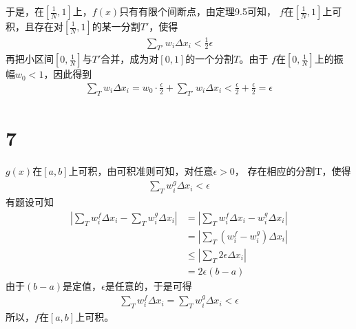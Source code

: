 \documentclass{article}
\begin{document}
于是，在$[\frac{1}{N}, 1]$上，$f(x)$只有有限个间断点，由定理9.5可知，
$f$在$[\frac{1}{N}, 1]$上可积，且存在对$[\frac{1}{N}, 1]$的某一分割$T'$，使得
\begin{align*}
  \sum\limits_{T'} w_i \Delta x_i < \frac{1}{2} \epsilon
\end{align*}
再把小区间$[0, \frac{1}{N}]$与$T'$合并，成为对$[0, 1]$的一个分割$T$。由于
$f$在$[0, \frac{1}{N}]$上的振幅$w_0 < 1$，因此得到
\begin{align*}
  \sum\limits_{T} w_i \Delta x_i 
  = w_0 \cdot \frac{\epsilon}{2} + \sum\limits_{T'} w_i \Delta x_i
  < \frac{\epsilon}{2} + \frac{\epsilon}{2} 
  = \epsilon
\end{align*}


\section*{7}

$g(x)$在$[a, b]$上可积，由可积准则可知，对任意$\epsilon > 0$，
存在相应的分割T，使得
\begin{align*}
  \sum \limits_{T} w_i^g \Delta x_i < \epsilon
\end{align*}
有题设可知
\begin{align*}
  |\sum \limits_{T} w_i^f \Delta x_i - \sum \limits_{T} w_i^g \Delta x_i|
   & = |\sum \limits_{T} w_i^f \Delta x_i - w_i^g \Delta x_i| \\
   & = |\sum \limits_{T} (w_i^f - w_i^g) \Delta x_i|          \\
   & \leq |\sum \limits_{T} 2\epsilon \Delta x_i|             \\
   & = 2\epsilon (b - a)
\end{align*}
由于$(b - a)$是定值，$\epsilon$是任意的，于是可得
\begin{align*}
  \sum \limits_{T} w_i^f \Delta x_i = \sum \limits_{T} w_i^g \Delta x_i < \epsilon
\end{align*}
所以，$f$在$[a, b]$上可积。
\end{document}
